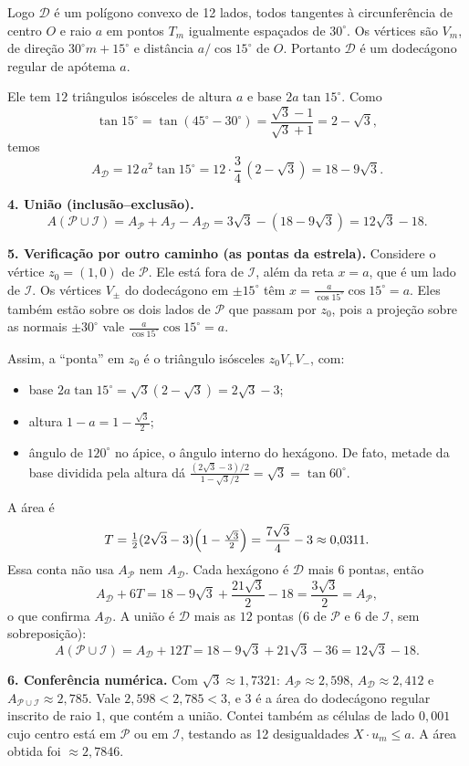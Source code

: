 \documentclass{article}%
\begin{document}
Logo $\mathcal D$ é um polígono convexo de 12 lados, todos tangentes à circunferência de centro $O$ e raio $a$ em pontos $T_m$ igualmente espaçados de $30^\circ$. Os vértices são $V_m$, de direção $30^\circ m+15^\circ$ e distância $a/\cos15^\circ$ de $O$. Portanto $\mathcal D$ é um dodecágono regular de apótema $a$.

Ele tem $12$ triângulos isósceles de altura $a$ e base $2a\tan15^\circ$. Como
\[
\tan15^\circ=\tan(45^\circ-30^\circ)=\frac{\sqrt3-1}{\sqrt3+1}=2-\sqrt3,
\]
temos
\[
A_{\mathcal D}=12\,a^2\tan15^\circ=12\cdot\frac34\,(2-\sqrt3)=18-9\sqrt3 .
\]

\textbf{4. União (inclusão--exclusão).}
\[
A(\mathcal P\cup\mathcal I)=A_{\mathcal P}+A_{\mathcal I}-A_{\mathcal D}
=3\sqrt3-(18-9\sqrt3)=12\sqrt3-18 .
\]

\textbf{5. Verificação por outro caminho (as pontas da estrela).} Considere o vértice $z_0=(1,0)$ de $\mathcal P$. Ele está fora de $\mathcal I$, além da reta $x=a$, que é um lado de $\mathcal I$. Os vértices $V_{\pm}$ do dodecágono em $\pm15^\circ$ têm $x=\frac{a}{\cos15^\circ}\cos15^\circ=a$. Eles também estão sobre os dois lados de $\mathcal P$ que passam por $z_0$, pois a projeção sobre as normais $\pm30^\circ$ vale $\frac{a}{\cos15^\circ}\cos15^\circ=a$.

Assim, a ``ponta'' em $z_0$ é o triângulo isósceles $z_0V_+V_-$, com:
\begin{itemize}
\item base $2a\tan15^\circ=\sqrt3(2-\sqrt3)=2\sqrt3-3$;
\item altura $1-a=1-\frac{\sqrt3}{2}$;
\item ângulo de $120^\circ$ no ápice, o ângulo interno do hexágono. De fato, metade da base dividida pela altura dá $\frac{(2\sqrt3-3)/2}{1-\sqrt3/2}=\sqrt3=\tan60^\circ$.
\end{itemize}
A área é
\[
T=\tfrac12(2\sqrt3-3)\Bigl(1-\tfrac{\sqrt3}{2}\Bigr)=\frac{7\sqrt3}{4}-3\approx0{,}0311 .
\]
Essa conta não usa $A_{\mathcal P}$ nem $A_{\mathcal D}$. Cada hexágono é $\mathcal D$ mais $6$ pontas, então
\[
A_{\mathcal D}+6T=18-9\sqrt3+\frac{21\sqrt3}{2}-18=\frac{3\sqrt3}{2}=A_{\mathcal P},
\]
o que confirma $A_{\mathcal D}$. A união é $\mathcal D$ mais as $12$ pontas (6 de $\mathcal P$ e 6 de $\mathcal I$, sem sobreposição):
\[
A(\mathcal P\cup\mathcal I)=A_{\mathcal D}+12T=18-9\sqrt3+21\sqrt3-36=12\sqrt3-18 .
\]

\textbf{6. Conferência numérica.} Com $\sqrt3\approx1{,}7321$: $A_{\mathcal P}\approx2{,}598$, $A_{\mathcal D}\approx2{,}412$ e $A_{\mathcal P\cup\mathcal I}\approx2{,}785$. Vale $2{,}598<2{,}785<3$, e $3$ é a área do dodecágono regular inscrito de raio $1$, que contém a união. Contei também as células de lado $0{,}001$ cujo centro está em $\mathcal P$ ou em $\mathcal I$, testando as 12 desigualdades $X\cdot u_m\le a$. A área obtida foi $\approx2{,}7846$.
\end{document}
